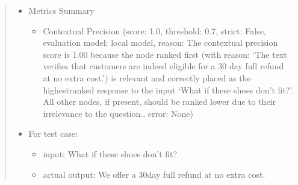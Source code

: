 \documentclass[letterpaper,11pt,english]{sphinxmanual}
\begin{document}
\begin{itemize}
\begin{itemize}
\begin{quote}
\begin{sphinxVerbatim}[commandchars=\\\{\}]
  
  


\PYG{p}{[}\PYG{p}{]} \PYG{p}{[}\PYG{p}{]}
\end{sphinxVerbatim}
\begin{itemize}
\item {} 
\sphinxAtStartPar
Metrics Summary
\begin{itemize}
\item {} 
\sphinxAtStartPar
Contextual Precision (score: 1.0, threshold: 0.7, strict: False, evaluation
model: local model, reason: The contextual precision score is 1.00 because
the node ranked first (with reason: ‘The text verifies that customers are
indeed eligible for a 30 day full refund at no extra cost.’) is relevant
and correctly placed as the highest\sphinxhyphen{}ranked response to the input
‘What if these shoes don’t fit?’. All other nodes, if present,
should be ranked lower due to their irrelevance to the question., error: None)

\end{itemize}

\item {} 
\sphinxAtStartPar
For test case:
\begin{itemize}
\item {} 
\sphinxAtStartPar
input: What if these shoes don’t fit?

\item {} 
\sphinxAtStartPar
actual output: We offer a 30\sphinxhyphen{}day full refund at no extra cost.


\end{itemize}
\end{itemize}
\end{quote}
\end{itemize}
\end{itemize}
\end{document}
